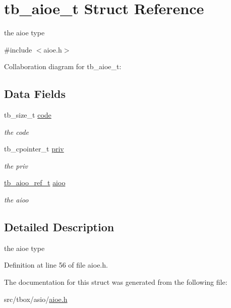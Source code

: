 \hypertarget{structtb__aioe__t}{\section{tb\-\_\-aioe\-\_\-t Struct Reference}
\label{structtb__aioe__t}
}


the aioe type  




{\ttfamily \#include $<$aioe.\-h$>$}



Collaboration diagram for tb\-\_\-aioe\-\_\-t\-:
\subsection*{Data Fields}
\begin{DoxyCompactItemize}
\item 
\hypertarget{structtb__aioe__t_adab86bfa3abee6a9e629f4a76cb82c81}{tb\-\_\-size\-\_\-t \hyperlink{structtb__aioe__t_adab86bfa3abee6a9e629f4a76cb82c81}{code}}\label{structtb__aioe__t_adab86bfa3abee6a9e629f4a76cb82c81}

\begin{DoxyCompactList}\small\item\em the code \end{DoxyCompactList}\item 
\hypertarget{structtb__aioe__t_a9d5e338ee7107080329be981b52fece4}{tb\-\_\-cpointer\-\_\-t \hyperlink{structtb__aioe__t_a9d5e338ee7107080329be981b52fece4}{priv}}\label{structtb__aioe__t_a9d5e338ee7107080329be981b52fece4}

\begin{DoxyCompactList}\small\item\em the priv \end{DoxyCompactList}\item 
\hypertarget{structtb__aioe__t_a19f50e8e399b12495e92678b0fda8d70}{\hyperlink{structtb__aioo__ref__t}{tb\-\_\-aioo\-\_\-ref\-\_\-t} \hyperlink{structtb__aioe__t_a19f50e8e399b12495e92678b0fda8d70}{aioo}}\label{structtb__aioe__t_a19f50e8e399b12495e92678b0fda8d70}

\begin{DoxyCompactList}\small\item\em the aioo \end{DoxyCompactList}\end{DoxyCompactItemize}


\subsection{Detailed Description}
the aioe type 

Definition at line 56 of file aioe.\-h.



The documentation for this struct was generated from the following file\-:\begin{DoxyCompactItemize}
\item 
src/tbox/asio/\hyperlink{aioe_8h}{aioe.\-h}\end{DoxyCompactItemize}
